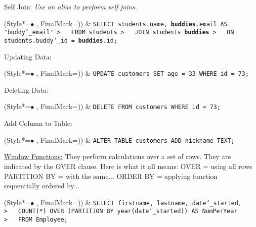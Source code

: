 \vspace{\baselineskip}
Self Join:\newline
\textit{Use an alias to perform self joins.}
\begin{easylist}[itemize]
\ListProperties(Style*=$\bullet$ , FinalMark={)})
& \texttt{SELECT students.name, \textbf{buddies}.email AS "buddy\char`_email"\newline
>~~~FROM students\newline
>~~~JOIN students \textbf{buddies}\newline
>~~~ON students.buddy\char`_id = \textbf{buddies}.id;}
\end{easylist}

\newpage
Updating Data:
\begin{easylist}[itemize]
\ListProperties(Style*=$\bullet$ , FinalMark={)})
& \texttt{UPDATE customers SET age = 33 WHERE id = 73;}
\end{easylist}

\vspace{\baselineskip}
Deleting Data:
\begin{easylist}[itemize]
\ListProperties(Style*=$\bullet$ , FinalMark={)})
& \texttt{DELETE FROM customers WHERE id = 73;}
\end{easylist}

\vspace{\baselineskip}
Add Column to Table:
\begin{easylist}[itemize]
\ListProperties(Style*=$\bullet$ , FinalMark={)})
& \texttt{ALTER TABLE customers ADD nickname TEXT;}
\end{easylist}

\vspace{\baselineskip}
\underline{Window Functions:}\newline
They perform calculations over a set of rows.
They are indicated by the OVER clause.\newline
\newline
Here is what it all means:\newline
OVER = using all rows\newline
PARTITION BY = with the same...\newline
ORDER BY = applying function sequentially ordered by...
% 
\begin{easylist}[itemize]
\ListProperties(Style*=$\bullet$ , FinalMark={)})
& \texttt{SELECT firstname, lastname, date\char`_started,\newline
>~~~COUNT(*) OVER (PARTITION BY year(date\char`_started)) AS NumPerYear\newline
>~~~FROM Employee;}
\end{easylist}



\newpage




















